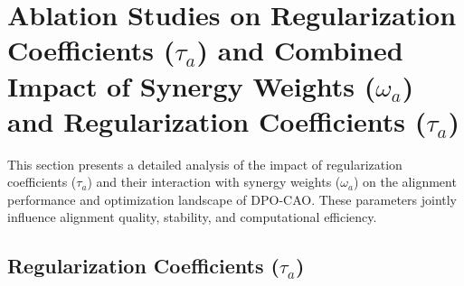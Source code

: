 




\section{Ablation Studies on Regularization Coefficients (\( \tau_a \)) and Combined Impact of Synergy Weights (\( \omega_a \)) and Regularization Coefficients (\( \tau_a \))}
\label{sec:appendix:ablation_regularization_synergy}

This section presents a detailed analysis of the impact of regularization coefficients (\( \tau_a \)) and their interaction with synergy weights (\( \omega_a \)) on the alignment performance and optimization landscape of DPO-CAO. These parameters jointly influence alignment quality, stability, and computational efficiency.

\subsection{Regularization Coefficients (\( \tau_a \))}

